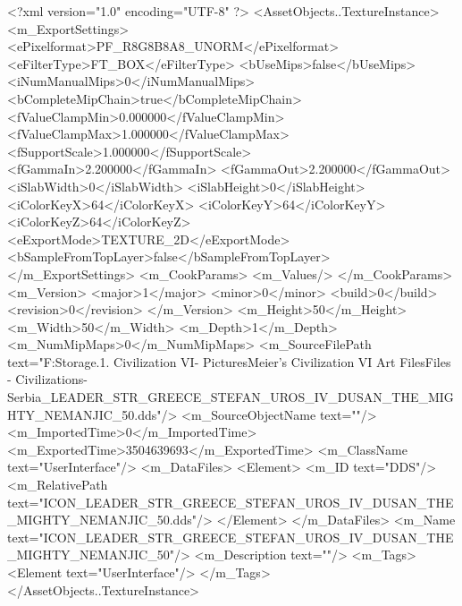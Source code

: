 <?xml version="1.0" encoding="UTF-8" ?>
<AssetObjects..TextureInstance>
	<m_ExportSettings>
		<ePixelformat>PF_R8G8B8A8_UNORM</ePixelformat>
		<eFilterType>FT_BOX</eFilterType>
		<bUseMips>false</bUseMips>
		<iNumManualMips>0</iNumManualMips>
		<bCompleteMipChain>true</bCompleteMipChain>
		<fValueClampMin>0.000000</fValueClampMin>
		<fValueClampMax>1.000000</fValueClampMax>
		<fSupportScale>1.000000</fSupportScale>
		<fGammaIn>2.200000</fGammaIn>
		<fGammaOut>2.200000</fGammaOut>
		<iSlabWidth>0</iSlabWidth>
		<iSlabHeight>0</iSlabHeight>
		<iColorKeyX>64</iColorKeyX>
		<iColorKeyY>64</iColorKeyY>
		<iColorKeyZ>64</iColorKeyZ>
		<eExportMode>TEXTURE_2D</eExportMode>
		<bSampleFromTopLayer>false</bSampleFromTopLayer>
	</m_ExportSettings>
	<m_CookParams>
		<m_Values/>
	</m_CookParams>
	<m_Version>
		<major>1</major>
		<minor>0</minor>
		<build>0</build>
		<revision>0</revision>
	</m_Version>
	<m_Height>50</m_Height>
	<m_Width>50</m_Width>
	<m_Depth>1</m_Depth>
	<m_NumMipMaps>0</m_NumMipMaps>
	<m_SourceFilePath text="F:\Mod Storage\2.1. Civilization VI\Mods\Archive - Pictures\Sid Meier's Civilization VI Art Files\Art Files - Civilizations\Civilization - Serbia\ICON_LEADER_STR_GREECE_STEFAN_UROS_IV_DUSAN_THE_MIGHTY_NEMANJIC_50.dds"/>
	<m_SourceObjectName text=""/>
	<m_ImportedTime>0</m_ImportedTime>
	<m_ExportedTime>3504639693</m_ExportedTime>
	<m_ClassName text="UserInterface"/>
	<m_DataFiles>
		<Element>
			<m_ID text="DDS"/>
			<m_RelativePath text="ICON_LEADER_STR_GREECE_STEFAN_UROS_IV_DUSAN_THE_MIGHTY_NEMANJIC_50.dds"/>
		</Element>
	</m_DataFiles>
	<m_Name text="ICON_LEADER_STR_GREECE_STEFAN_UROS_IV_DUSAN_THE_MIGHTY_NEMANJIC_50"/>
	<m_Description text=""/>
	<m_Tags>
		<Element text="UserInterface"/>
	</m_Tags>
</AssetObjects..TextureInstance>

